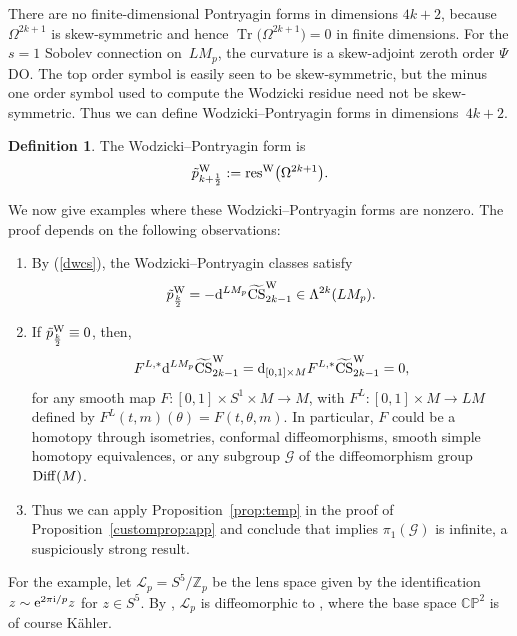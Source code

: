 \documentclass[pdftex]{sigma}
\numberwithin{equation}{section}
\theoremstyle{definition}
\newtheorem{Definition}[Theorem]{Definition}
\newcommand{\BbZ}{{\mathbb Z}}
\newcommand{\diff}{{\rm Diff} }
\newcommand{\Z}{\BbZ}
\newcommand{\calL}{\mathcal{L}}
\newcommand{\resw}{{\rm res}^{\rm W}}
\newcommand{\bm}{ M}
\newcommand{\ocs}{\widetilde{{\rm CS}}}
\newcommand{\tp}{\tilde p}
\newcommand{\omp}{M_p}
\newcommand{\itm}{[0,1]\times M}
\begin{document}
There are no finite-dimensional Pontryagin forms in dimensions $4k+2$, because $\Omega^{2k+1}$ is skew-symmetric and hence
$\operatorname{Tr}\bigl(\Omega^{2k+1}\bigr) =0$ in finite dimensions. For the $s=1$ Sobolev connection on~$L\omp$, the curvature is a skew-adjoint zeroth order $\Psi$DO. The top order symbol is easily seen to be skew-symmetric, but the minus one order symbol used to compute the Wodzicki residue need not be skew-symmetric. Thus we can define Wodzicki--Pontryagin forms in dimensions~${4k+2}$.

\begin{Definition} The Wodzicki--Pontryagin form \smash{$\tp^{\rm W}_{k+\frac{1}{2}}\in \Lambda^{4k+2}(L\omp)$} is
\[\tp^{\rm W}_{k+\frac{1}{2}} :=
\resw\bigl(\Omega^{2k+1}\bigr).\]
\end{Definition}

 We now give examples where these Wodzicki--Pontryagin forms are nonzero. The proof depends on the following observations:
 \begin{enumerate}\itemsep=0pt
 \item By (\ref{dwcs}),
the Wodzicki--Pontryagin classes satisfy
 \begin{equation*}%
 \tp^{\rm W}_{\frac{k}{2}} = -{\rm d}^{LM_p}\ocs^{\rm W}_{2k-1}\in \Lambda^{2k}(LM_p).
 \end{equation*}
 \item If $\tp^{\rm W}_{\frac{k}{2}} \equiv 0$, then,
 \[F^{L,*} {\rm d}^{LM_p}\ocs^{\rm W}_{2k-1} = {\rm d}_{\itm}F^{L,*}\ocs^{\rm W}_{2k-1} =0,\]
for any smooth map
$F\colon [0,1]\times S^1\times \bm\to \bm$, with
$F^L\colon [0,1]\times \bm\to L\bm$ defined by $ F^L(t,m)(\theta) = F(t,\theta, m)$. In particular, $F$ could be a homotopy through isometries, conformal diffeomorphisms, smooth simple homotopy equivalences, or any subgroup $\mathcal{G}$ of the diffeomorphism group $\diff(M)$.
\item Thus we can apply
Proposition~\ref{prop:temp} in the proof of Proposition~\ref{customprop:app} and conclude that \smash{$a^{L,*}\ocs{}^{\rm W}_{2k-1}(g) \neq 0$} implies $\pi_1(\mathcal{G})$ is infinite, a suspiciously strong result.
 \end{enumerate}

For the example, let $\calL_p = S^5/\Z_p$ be the lens space given by the identification $z \sim {\rm e}^{2\pi {\rm i}/p}z$ for $
z\in S^5$.
By \cite[Proposition 3.14]{MRT4}, $\calL_p$ is diffeomorphic to , where the base space $\mathbb{CP}^2$ is of course K\"ahler.
\end{document}
